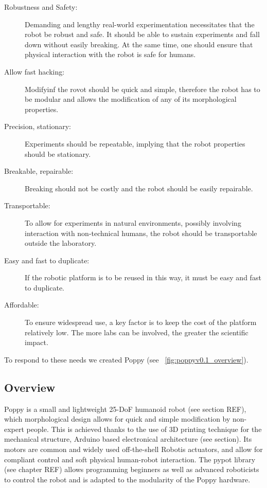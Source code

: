 \begin{description}
    \item[Robustness and Safety:] Demanding and lengthy real-world experimentation necessitates that the robot be robust and safe. It should be able to sustain experiments and fall down without easily breaking. At the same time, one should ensure that physical interaction with the robot is safe for humans.
    \item [Allow fast hacking:] Modifyinf the rovot should be quick and simple, therefore the robot has to be modular and allows the modification of any of its morphological properties.
    \item [Precision, stationary:]Experiments should be repeatable, implying that the robot properties should be stationary.
    \item [Breakable, repairable:] Breaking should not be costly and the robot should be easily repairable.
    \item [Transportable:] To allow for experiments in natural environments, possibly involving interaction with non-technical humans, the robot should be transportable outside the laboratory.
    \item [Easy and fast to duplicate:] If the robotic platform is to be reused in this way, it must be easy and fast to duplicate.
    \item [Affordable:] To ensure widespread use, a key factor is to keep the cost of the platform relatively low. The more labs can be involved, the greater the scientific impact.
\end{description}


To respond to these needs we created Poppy (see \figurename~\ref{fig:poppyv0.1_overview}).

\subsection{Overview} %

Poppy is a small and lightweight 25-DoF humanoid robot (see section REF), which morphological design allows for quick and simple modification by non-expert people. This is achieved thanks to the use of 3D printing technique for the mechanical structure, Arduino based electronical architecture (see section). Its motors are common and widely used off-the-shell Robotis actuators, and allow for compliant control and soft physical human-robot interaction. The pypot library (see chapter REF) allows programming beginners as well as advanced roboticists to control the robot and is adapted to the modularity of the Poppy hardware.

